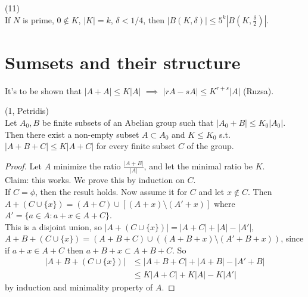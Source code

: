 \documentclass[a4paper]{article}
\begin{document}
\begin{coro} (11)\\
    If $N$ is prime, $0 \not \in K$, $|K| = k$, $\delta < 1/4$, then $|B(K,\delta)| \leq 5^k |B(K,\frac{\delta}{2})|$.
\end{coro}

\newpage

\section{Sumsets and their structure}
It's to be shown that $|A+A| \leq K|A|$ $\implies$ $|rA-sA| \leq K^{r+s}|A|$ (Ruzsa).

\begin{lemma} (1, Petridis)\\
    Let $A_0,B$ be finite subsets of an Abelian group such that $|A_0+B| \leq K_0|A_0|$. Then there exist a non-empty subset $A \subset A_0$ and $K \leq K_0$ s.t. $|A+B+C| \leq K|A+C|$ for every finite subset $C$ of the group.
    \begin{proof}
        Let $A$ minimize the ratio $\frac{|A+B|}{|A|}$, and let the minimal ratio be $K$.\\
        Claim: this works. We prove this by induction on $C$.\\
        If $C =\phi$, then the result holds. Now assume it for $C$ and let $x \not\in C$. Then $A+(C \cup \{x\}) = (A+C) \cup [(A+x) \setminus (A'+x)]$ where $A' = \{a \in A:a+x \in A+C\}$.\\
        This is a disjoint union, so $|A+(C\cup \{x\})| = |A+C|+|A|-|A'|$, $A+B+(C\cup\{x\}) = (A+B+C) \cup ((A+B+x)\setminus (A'+B+x))$, since if $a+x \in A+C$ then $a+B+x \subset A+B+C$. So
        \begin{equation*}
            \begin{aligned}
                |A+B+(C\cup\{x\})| &\leq |A+B+C|+|A+B|-|A'+B|\\
                &\leq K|A+C|+K|A|-K|A'|
            \end{aligned}
        \end{equation*}
        by induction and minimality property of $A$.
    \end{proof}
\end{lemma}
\end{document}
